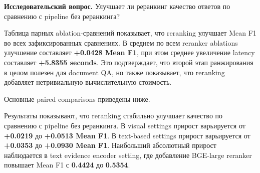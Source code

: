 \documentclass[conference]{IEEEtran}
\begin{document}
\textbf{Исследовательский вопрос.} Улучшает ли реранкинг качество ответов по сравнению с pipeline без реранкинга?

Таблица парных ablation-сравнений показывает, что reranking улучшает Mean F1 во всех зафиксированных сравнениях. В среднем по всем reranker ablations улучшение составляет \textbf{+0.0428 Mean F1}, при этом среднее увеличение latency составляет \textbf{+5.8355 seconds}. Это подтверждает, что второй этап ранжирования в целом полезен для document QA, но также показывает, что reranking добавляет нетривиальную вычислительную стоимость.

Основные paired comparisons приведены ниже.

\begin{table}[t]
\caption{Таблица 3}
\centering
\scriptsize
{}
\end{table}

Результаты показывают, что reranking стабильно улучшает качество по сравнению с pipeline без реранкинга. В visual settings прирост варьируется от \textbf{+0.0219} до \textbf{+0.0513 Mean F1}. В text-based settings прирост варьируется от \textbf{+0.0353} до \textbf{+0.0930 Mean F1}. Наибольший абсолютный прирост наблюдается в text evidence encoder setting, где добавление BGE-large reranker повышает Mean F1 с \textbf{0.4424} до \textbf{0.5354}.
\end{document}
